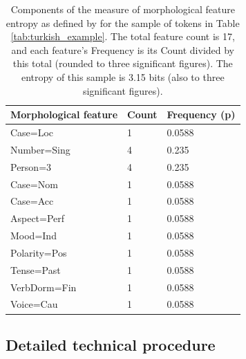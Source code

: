 \documentclass[USenglish]{article}
\begin{document}
\begin{table}[h]
    \centering
    \caption{Components of the measure of morphological feature entropy as defined by \citet{ccoltekin2023complexity} for the sample of tokens in Table \ref{tab:turkish_example}. The total feature count is 17, and each feature's Frequency is its Count divided by this total (rounded to three significant figures). The entropy of this sample is 3.15 bits (also to three significant figures).} %
    \label{tab:mfh}   
    \begin{tabular}{p{5cm}p{3cm}p{3cm}}
\toprule
	\textbf{Morphological feature}	&	\textbf{Count}	&	\textbf{Frequency (p)}	\\
    \midrule
	Case=Loc&1&0.0588       \\    \midrule
	Number=Sing&4&0.235    \\    \midrule
        Person=3&4&0.235		   \\    \midrule
	Case=Nom&1&0.0588	       \\    \midrule
	Case=Acc&1&0.0588		      \\    \midrule
        Aspect=Perf&1&0.0588      \\    \midrule
        Mood=Ind&1&0.0588		   \\    \midrule
        Polarity=Pos&1&0.0588		\\    \midrule
	Tense=Past&1&0.0588	     \\    \midrule
	VerbDorm=Fin&1&0.0588	    \\    \midrule
	Voice=Cau&1&0.0588      	\\ \bottomrule

    \end{tabular}
\end{table}


\subsection{Detailed technical procedure}
\end{document}

